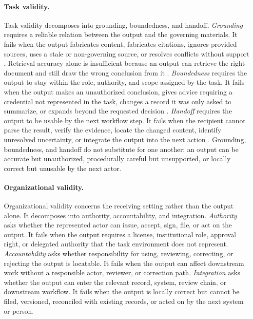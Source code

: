 \documentclass{article}
\begin{document}
\paragraph{Task validity.}
Task validity decomposes into grounding, boundedness, and handoff. \emph{Grounding} requires a reliable relation between the output and the governing materials.
It fails when the output fabricates content, fabricates citations, ignores provided sources, uses a stale or non-governing source, or resolves conflicts without support \citep{maynez2020faithfulness,ji2023hallucination,lewis2020rag}.
Retrieval accuracy alone is insufficient because an output can retrieve the right document and still draw the wrong conclusion from it \citep{lewis2020rag,maynez2020faithfulness}. \emph{Boundedness} requires the output to stay within the role, authority, and scope assigned by the task.
It fails when the output makes an unauthorized conclusion, gives advice requiring a credential not represented in the task, changes a record it was only asked to summarize, or expands beyond the requested decision \citep{abbott1988system,freidson2001professionalism}. \emph{Handoff} requires the output to be usable by the next workflow step.
It fails when the recipient cannot parse the result, verify the evidence, locate the changed content, identify unresolved uncertainty, or integrate the output into the next action \citep{carlile2002pragmatic,carlile2004transferring,prov2013prov}.
Grounding, boundedness, and handoff do not substitute for one another: an output can be accurate but unauthorized, procedurally careful but unsupported, or locally correct but unusable by the next actor.

\paragraph{Organizational validity.}
Organizational validity concerns the receiving setting rather than the output alone.
It decomposes into authority, accountability, and integration.
\emph{Authority} asks whether the represented actor can issue, accept, sign, file, or act on the output.
It fails when the output requires a license, institutional role, approval right, or delegated authority that the task environment does not represent.
\emph{Accountability} asks whether responsibility for using, reviewing, correcting, or rejecting the output is locatable.
It fails when the output can affect downstream work without a responsible actor, reviewer, or correction path.
\emph{Integration} asks whether the output can enter the relevant record, system, review chain, or downstream workflow.
It fails when the output is locally correct but cannot be filed, versioned, reconciled with existing records, or acted on by the next system or person.
\end{document}
